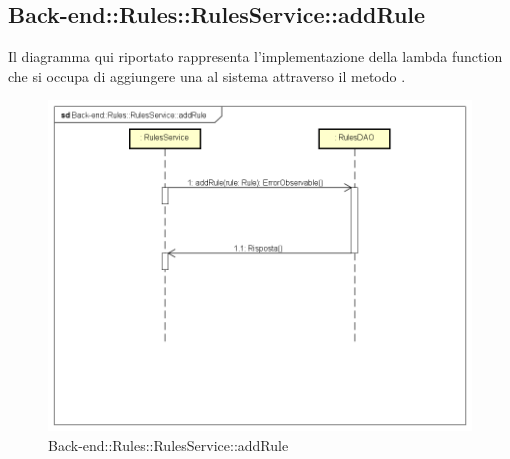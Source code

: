 \subsection{Back-end::Rules::RulesService::addRule}
Il diagramma qui riportato rappresenta l'implementazione della lambda function che si occupa di aggiungere una  al sistema attraverso il metodo .
 \begin{figure}[h] \centering \includegraphics[width=\textwidth,height=\textheight,keepaspectratio]{images/diagrams/back-end/Ufficial_Backend/Back-endRulesRulesServiceaddRule.png} 	\caption{Back-end::Rules::RulesService::addRule}
\end{figure}
\newpage



